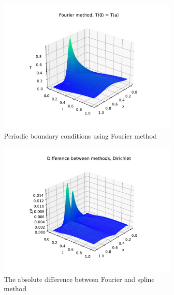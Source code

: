 \documentclass[12pt, a4paper]{article}
\begin{document}
\begin{figure}[hbtp]
  \begin{subfigure}{0.5\textwidth}
  \includegraphics[width=\linewidth]{graphs/1_exercise/fourier_gauss.pdf}
  \caption{Periodic boundary conditions using Fourier method} \label{fig:a}
  \end{subfigure}
  \hspace*{\fill}
  \begin{subfigure}{0.5\textwidth}
  \includegraphics[width=\linewidth]{graphs/1_exercise/difference_gauss.pdf}
  \caption{The absolute difference between Fourier and spline method} \label{fig:b}
  \end{subfigure}
  \medskip
  \begin{subfigure}{0.5\textwidth}

\end{subfigure}
\end{figure}
\end{document}
